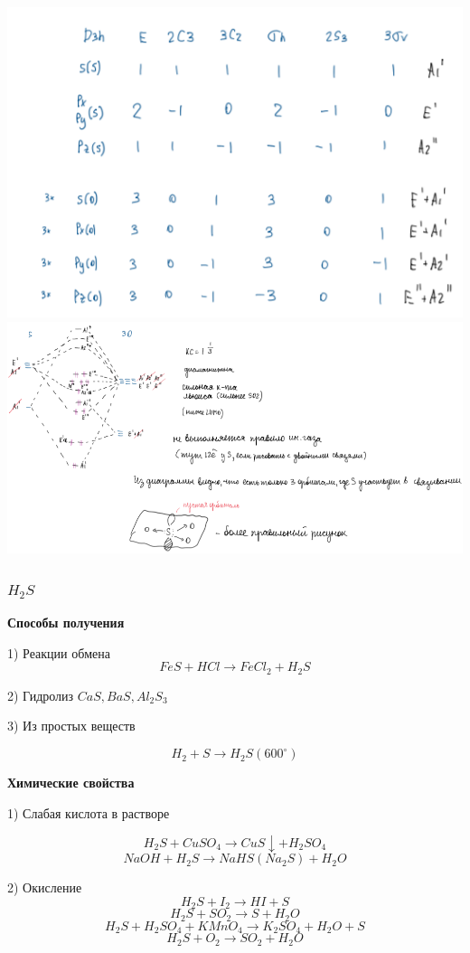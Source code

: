 \includegraphics{images/7v4.png}\\
\includegraphics{images/7v5.png}

\subsubsection*{$H_2S$}

\textbf{Способы получения}

1) Реакции обмена
$$FeS + HCl \rightarrow FeCl_2 + H_2S$$

2) Гидролиз $CaS, BaS, Al_2S_3$

3) Из простых веществ

$$H_2 + S \rightarrow H_2S(600^{\circ})$$

\textbf{Химические свойства}

1) Слабая кислота в растворе

$$H_2S + CuSO_4 \rightarrow CuS\downarrow + H_2SO_4$$
$$NaOH + H_2S \rightarrow NaHS (Na_2S) + H_2O$$

2) Окисление $$H_2S + I_2 \rightarrow HI + S$$
$$H_2S + SO_2 \rightarrow S+ H_2O$$
$$H_2S + H_2SO_4 + KMnO_4 \rightarrow K_2SO_4 + H_2O + S$$
$$H_2S + O_2 \rightarrow SO_2 + H_2O$$

